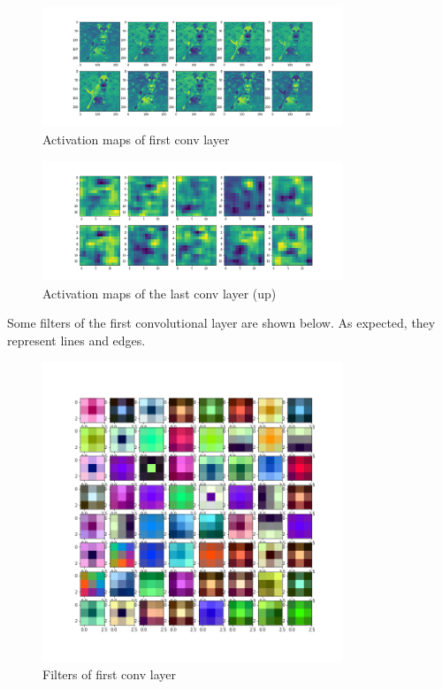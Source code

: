 \documentclass{article}
\begin{document}
\begin{figure}[h!]
		\centering
		\includegraphics[width=0.8\textwidth]{part2_pics/conv_activations_0.png}
		\caption{Activation maps of first conv layer}
\end{figure}
\begin{figure}[h!]
		\centering
		\includegraphics[width=0.8\textwidth]{part2_pics/conv_activations_1.png}
		\caption{Activation maps of the last conv layer (up)}
\end{figure}
Some filters of the first convolutional layer are shown below. As expected, they represent lines and edges. \\
\begin{figure}[h!]
		\centering
		\includegraphics[width=0.8\textwidth]{part2_pics/conv1_filters.png}
		\caption{Filters of first conv layer}
\end{figure}
\end{document}

